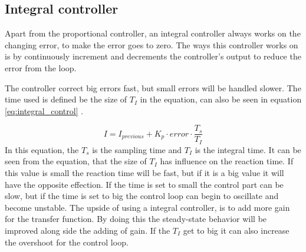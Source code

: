 \subsection*{Integral controller}
Apart from the proportional controller, an integral controller always works on the changing error, to make the error goes to zero. The ways this controller works on is by continuously increment and decrements the controller's output to reduce the error from the loop. 

The controller correct big errors fast, but small errors will be handled slower. The time used is defined be the size of $T_I$ in the equation, can also be seen in equation \ref{eq:integral_control} \cite{PID_book}. 

\begin{equation}\label{eq:integral_control}
    I = I_{previous} + K_p \cdot error \cdot \frac{T_s}{T_I}
\end{equation}
In this equation, the $T_s$ is the sampling time and $T_I$ is the integral time. It can be seen from the equation, that the size of $T_I$ has influence on the reaction time. If this value is small the reaction time will be fast, but if it is a big value it will have the opposite effection. If the time is set to small the control part can be slow, but if the time is set to big the control loop can begin to oscillate and become unstable. The upside of using a integral controller, is to add more gain for the transfer function. By doing this the steady-state behavior will be improved along side the adding of gain. 
If the $T_I$ get to big it can also increase the overshoot for the control loop\cite{PID_book}. 


